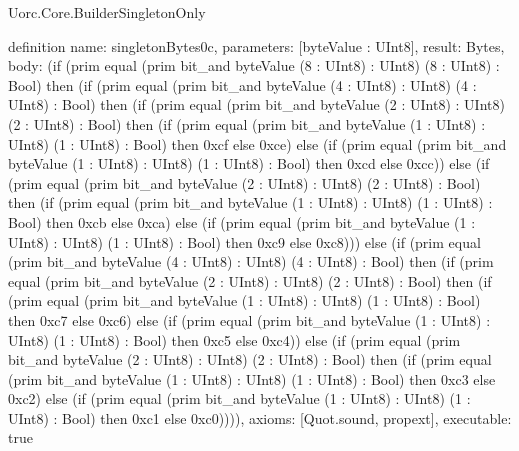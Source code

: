 \begin{lexlean}{Uorc.Core.BuilderSingletonOnly}
\begin{semanticmodule}
definition{
  name: singletonBytes0c,
  parameters: [byteValue : UInt8],
  result: Bytes,
  body: (if (prim equal (prim bit_and byteValue (8 : UInt8) : UInt8) (8 : UInt8) : Bool) then (if (prim equal (prim bit_and byteValue (4 : UInt8) : UInt8) (4 : UInt8) : Bool) then (if (prim equal (prim bit_and byteValue (2 : UInt8) : UInt8) (2 : UInt8) : Bool) then (if (prim equal (prim bit_and byteValue (1 : UInt8) : UInt8) (1 : UInt8) : Bool) then 0xcf else 0xce) else (if (prim equal (prim bit_and byteValue (1 : UInt8) : UInt8) (1 : UInt8) : Bool) then 0xcd else 0xcc)) else (if (prim equal (prim bit_and byteValue (2 : UInt8) : UInt8) (2 : UInt8) : Bool) then (if (prim equal (prim bit_and byteValue (1 : UInt8) : UInt8) (1 : UInt8) : Bool) then 0xcb else 0xca) else (if (prim equal (prim bit_and byteValue (1 : UInt8) : UInt8) (1 : UInt8) : Bool) then 0xc9 else 0xc8))) else (if (prim equal (prim bit_and byteValue (4 : UInt8) : UInt8) (4 : UInt8) : Bool) then (if (prim equal (prim bit_and byteValue (2 : UInt8) : UInt8) (2 : UInt8) : Bool) then (if (prim equal (prim bit_and byteValue (1 : UInt8) : UInt8) (1 : UInt8) : Bool) then 0xc7 else 0xc6) else (if (prim equal (prim bit_and byteValue (1 : UInt8) : UInt8) (1 : UInt8) : Bool) then 0xc5 else 0xc4)) else (if (prim equal (prim bit_and byteValue (2 : UInt8) : UInt8) (2 : UInt8) : Bool) then (if (prim equal (prim bit_and byteValue (1 : UInt8) : UInt8) (1 : UInt8) : Bool) then 0xc3 else 0xc2) else (if (prim equal (prim bit_and byteValue (1 : UInt8) : UInt8) (1 : UInt8) : Bool) then 0xc1 else 0xc0)))),
  axioms: [Quot.sound, propext],
  executable: true
}


\end{semanticmodule}
\end{lexlean}
